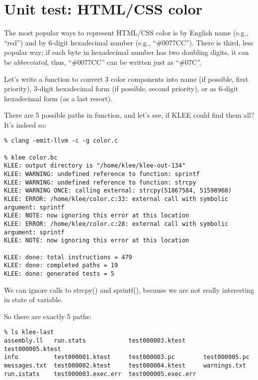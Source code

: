 \section{Unit test: HTML/CSS color}

The most popular ways to represent HTML/CSS color is by English name (e.g., ``red'') and by 6-digit hexadecimal number (e.g., ``\#0077CC'').
There is third, less popular way: if each byte in hexadecimal number has two doubling digits, it can be \textit{abbreviated}, thus, 
``\#0077CC'' can be written just as ``\#07C''.

Let's write a function to convert 3 color components into name (if possible, first priority), 3-digit hexadecimal form (if possible, second priority),
or as 6-digit hexadecimal form (as a last resort).



There are 5 possible paths in function, and let's see, if KLEE could find them all?
It's indeed so:

\begin{lstlisting}
% clang -emit-llvm -c -g color.c

% klee color.bc
KLEE: output directory is "/home/klee/klee-out-134"
KLEE: WARNING: undefined reference to function: sprintf
KLEE: WARNING: undefined reference to function: strcpy
KLEE: WARNING ONCE: calling external: strcpy(51867584, 51598960)
KLEE: ERROR: /home/klee/color.c:33: external call with symbolic argument: sprintf
KLEE: NOTE: now ignoring this error at this location
KLEE: ERROR: /home/klee/color.c:28: external call with symbolic argument: sprintf
KLEE: NOTE: now ignoring this error at this location

KLEE: done: total instructions = 479
KLEE: done: completed paths = 19
KLEE: done: generated tests = 5
\end{lstlisting}

We can ignore calls to strcpy() and sprintf(), because we are not really interesting in state of  variable.

So there are exactly 5 paths:

\begin{lstlisting}
% ls klee-last
assembly.ll   run.stats            test000003.ktest     test000005.ktest
info          test000001.ktest     test000003.pc        test000005.pc
messages.txt  test000002.ktest     test000004.ktest     warnings.txt
run.istats    test000003.exec.err  test000005.exec.err
\end{lstlisting}

